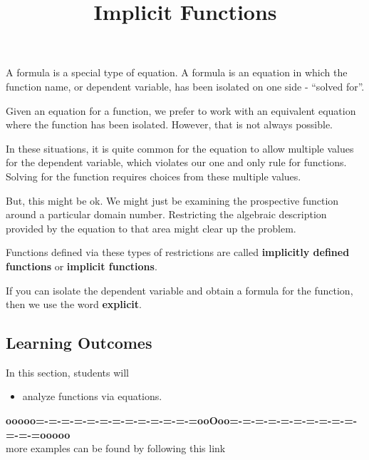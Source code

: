 \documentclass{ximera}
\title{Implicit Functions}
\begin{document}
\begin{abstract}
%
\end{abstract}
\maketitle



A formula is a special type of equation.  A formula is an equation in which the function name, or dependent variable, has been isolated on one side - ``solved for''.


Given an equation for a function, we prefer to work with an equivalent equation where the function has been isolated.  However, that is not always possible.

In these situations, it is quite common for the equation to allow multiple values for the dependent variable, which violates our one and only rule for functions.  Solving for the function requires choices from these multiple values.

But, this might be ok.  We might just be examining the prospective function around a particular domain number. Restricting the algebraic description provided by the equation to that area might clear up the problem.

Functions defined via these types of restrictions are called \textbf{implicitly defined functions} or \textbf{implicit functions}.

If you can isolate the dependent variable and obtain a formula for the function, then we use the word \textbf{explicit}.











\subsection{Learning Outcomes}


\begin{sectionOutcomes}
In this section, students will 

\begin{itemize}
\item analyze functions via equations.
\end{itemize}
\end{sectionOutcomes}












\begin{center}
\textbf{\textcolor{green!50!black}{ooooo=-=-=-=-=-=-=-=-=-=-=-=-=ooOoo=-=-=-=-=-=-=-=-=-=-=-=-=ooooo}} \\

more examples can be found by following this link\\ 

\end{center}
\end{document}
